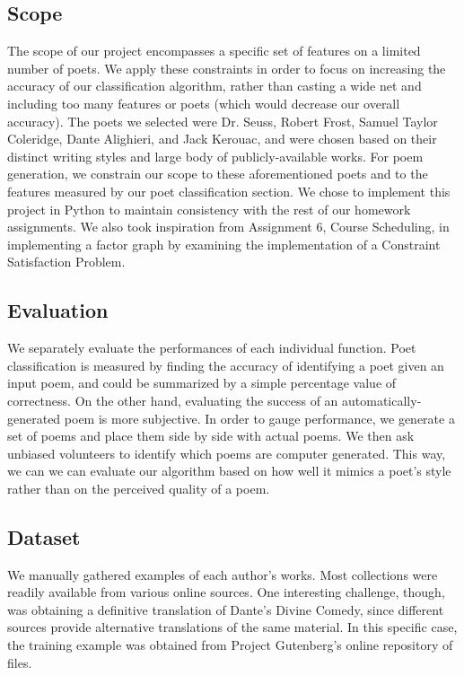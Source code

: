 \documentclass[journal]{IEEEtran}
\begin{document}
\subsection{Scope}
The scope of our project encompasses a specific set of features on a limited number of poets. We apply these constraints in order to focus on increasing the accuracy of our classification algorithm, rather than casting a wide net and including too many features or poets (which would decrease our overall accuracy). The poets we selected were Dr. Seuss, Robert Frost, Samuel Taylor Coleridge, Dante Alighieri, and Jack Kerouac, and were chosen based on their distinct writing styles and large body of publicly-available works. For poem generation, we constrain our scope to these aforementioned poets and to the features measured by our poet classification section. We chose to implement this project in Python to maintain consistency with the rest of our homework assignments. We also took inspiration from Assignment 6, Course Scheduling, in implementing a factor graph by examining the implementation of a Constraint Satisfaction Problem.

\subsection{Evaluation}
We separately evaluate the performances of each individual function. Poet classification is measured by finding the accuracy of identifying a poet given an input poem, and could be summarized by a simple percentage value of correctness. On the other hand, evaluating the success of an automatically-generated poem is more subjective. In order to gauge performance, we generate a set of poems and place them side by side with actual poems. We then ask unbiased volunteers to identify which poems are computer generated. This way, we can we can evaluate our algorithm based on how well it mimics a poet’s style rather than on the perceived quality of a poem.

\subsection{Dataset}
We manually gathered examples of each author’s works. Most collections were readily available from various online sources. One interesting challenge, though, was obtaining a definitive translation of Dante’s Divine Comedy, since different sources provide alternative translations of the same material. In this specific case, the training example was obtained from Project Gutenberg’s online repository of files.
\end{document}
